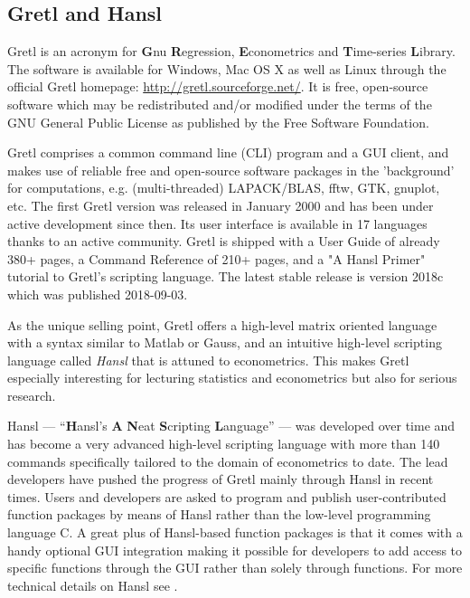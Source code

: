 \documentclass[11pt]{article}
\begin{document}
\subsection{Gretl and Hansl}
Gretl is an acronym for \textbf{G}nu \textbf{R}egression, \textbf{E}conometrics and \textbf{T}ime-series \textbf{L}ibrary. The software is available for Windows, Mac OS X as well as Linux through the official Gretl homepage: \url{http://gretl.sourceforge.net/}. It is free, open-source software which may be redistributed and/or modified under the terms of the GNU General Public License as published by the Free Software Foundation.

Gretl comprises %
a common command line (CLI) program and a GUI client, and makes use of reliable free and open-source software packages in the 'background' for computations, e.g. (multi-threaded) LAPACK/BLAS, fftw, GTK, gnuplot, etc. The first Gretl version was released in January 2000 and has been under active development %
since then. Its user interface is available in 17 languages thanks to an active community. Gretl is shipped with a User Guide of already 380+ pages, a Command Reference of 210+ pages, and a "A Hansl Primer" tutorial to Gretl's scripting language. %
The latest stable release is version 2018c which was published 2018-09-03.

As the unique selling point, Gretl offers a high-level matrix oriented language with a syntax similar to Matlab or Gauss, and an intuitive high-level scripting language called \textit{Hansl} that is attuned to econometrics. This makes Gretl especially interesting for lecturing statistics and econometrics but also for serious research.

Hansl --- “\textbf{H}ansl’s \textbf{A} \textbf{N}eat \textbf{S}cripting \textbf{L}anguage” --- was developed over time and has become a very advanced high-level scripting language with more than 140 commands specifically tailored to the domain of econometrics to date. 
The lead developers have pushed the progress of Gretl mainly through Hansl in recent times. Users and developers are asked to program and publish user-contributed function packages by means of Hansl rather than the low-level programming language C. A great plus of Hansl-based function packages is that it comes with a handy optional GUI integration making it possible for developers to add access to specific functions through the GUI rather than solely through functions. %
For more technical details on Hansl see \citet{Cottrell2017}.
\end{document}
